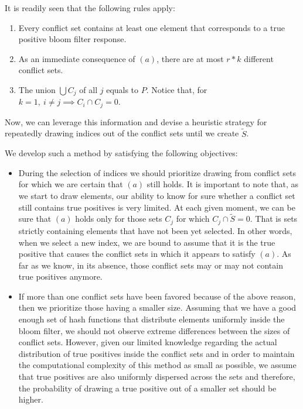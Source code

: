 
            It is readily seen that the following rules apply:
            \begin{enumerate}[label=(\alph*)]
            \item Every conflict set contains at least one element that corresponds to a true positive bloom filter response.
            \item As an immediate consequence of $(a)$, there are at most $r*k$ different conflict sets.
            \item The union $\bigcup C_{j}$ of all $j$ equals to $P$. 
            Notice that, for $k=1,\ i \neq j \implies C_i \cap C_j=0$.
            \end{enumerate}

            Now, we can leverage this information and devise a heuristic strategy for repeatedly drawing indices out of the conflict sets until we create $\tilde{S}$.
            
            We develop such a method by satisfying the following objectives:
            \begin{itemize}
                \item During the selection of indices we should prioritize drawing from conflict sets for which we are certain that $(a)$ still holds.
                It is important to note that, as we start to draw elements, our ability to know for sure whether a conflict set still contains true positives is very limited.
                At each given moment, we can be sure that $(a)$ holds only for those sets $C_j$ for which $C_j \cap \tilde{S}=0$. 
                That is sets strictly containing elements that have not been yet selected.
                In other words, when we select a new index, we are bound to assume that it is the true positive that causes the conflict sets in which it appears to satisfy $(a)$. 
                As far as we know, in its absence, those conflict sets may or may not contain true positives anymore.
                
                \item If more than one conflict sets have been favored because of the above reason, then we prioritize those having a smaller size. 
                Assuming that we have a good enough set of hash functions that distribute elements uniformly inside the bloom filter, we should not observe extreme differences between the sizes of conflict sets. 
                However, given our limited knowledge regarding the actual distribution of true positives inside the conflict sets and in order to maintain the computational complexity of this method as small as possible, we assume that true positives are also uniformly dispersed across the sets and therefore, the probability of drawing a true positive out of a smaller set should be higher.
            \end{itemize}
            
